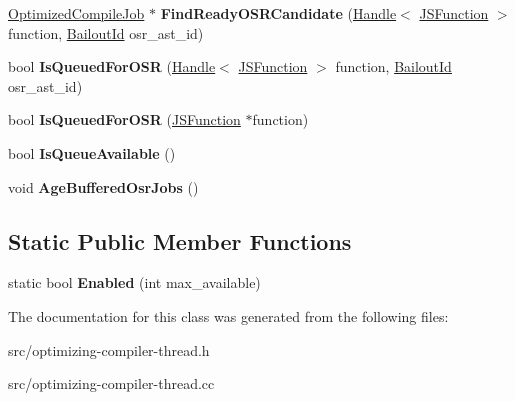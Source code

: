 \begin{DoxyCompactItemize}
\item 
\hypertarget{classv8_1_1internal_1_1_optimizing_compiler_thread_ac26451d45beab3fd272c0f62aea80f6e}{}\hyperlink{classv8_1_1internal_1_1_optimized_compile_job}{Optimized\+Compile\+Job} $\ast$ {\bfseries Find\+Ready\+O\+S\+R\+Candidate} (\hyperlink{classv8_1_1internal_1_1_handle}{Handle}$<$ \hyperlink{classv8_1_1internal_1_1_j_s_function}{J\+S\+Function} $>$ function, \hyperlink{classv8_1_1internal_1_1_bailout_id}{Bailout\+Id} osr\+\_\+ast\+\_\+id)\label{classv8_1_1internal_1_1_optimizing_compiler_thread_ac26451d45beab3fd272c0f62aea80f6e}

\item 
\hypertarget{classv8_1_1internal_1_1_optimizing_compiler_thread_a8c6bd97e45ddcf86180a239a1a780b1c}{}bool {\bfseries Is\+Queued\+For\+O\+S\+R} (\hyperlink{classv8_1_1internal_1_1_handle}{Handle}$<$ \hyperlink{classv8_1_1internal_1_1_j_s_function}{J\+S\+Function} $>$ function, \hyperlink{classv8_1_1internal_1_1_bailout_id}{Bailout\+Id} osr\+\_\+ast\+\_\+id)\label{classv8_1_1internal_1_1_optimizing_compiler_thread_a8c6bd97e45ddcf86180a239a1a780b1c}

\item 
\hypertarget{classv8_1_1internal_1_1_optimizing_compiler_thread_a53f5fbf23fd22a240c35fd183f2da533}{}bool {\bfseries Is\+Queued\+For\+O\+S\+R} (\hyperlink{classv8_1_1internal_1_1_j_s_function}{J\+S\+Function} $\ast$function)\label{classv8_1_1internal_1_1_optimizing_compiler_thread_a53f5fbf23fd22a240c35fd183f2da533}

\item 
\hypertarget{classv8_1_1internal_1_1_optimizing_compiler_thread_a06535287e5fe9c3b64f91b1987bfbfda}{}bool {\bfseries Is\+Queue\+Available} ()\label{classv8_1_1internal_1_1_optimizing_compiler_thread_a06535287e5fe9c3b64f91b1987bfbfda}

\item 
\hypertarget{classv8_1_1internal_1_1_optimizing_compiler_thread_ac809de038e669f630f4d32864b167729}{}void {\bfseries Age\+Buffered\+Osr\+Jobs} ()\label{classv8_1_1internal_1_1_optimizing_compiler_thread_ac809de038e669f630f4d32864b167729}

\end{DoxyCompactItemize}
\subsection*{Static Public Member Functions}
\begin{DoxyCompactItemize}
\item 
\hypertarget{classv8_1_1internal_1_1_optimizing_compiler_thread_a14c20db9e9f3f7ef0964be2abbaaea04}{}static bool {\bfseries Enabled} (int max\+\_\+available)\label{classv8_1_1internal_1_1_optimizing_compiler_thread_a14c20db9e9f3f7ef0964be2abbaaea04}

\end{DoxyCompactItemize}


The documentation for this class was generated from the following files\+:\begin{DoxyCompactItemize}
\item 
src/optimizing-\/compiler-\/thread.\+h\item 
src/optimizing-\/compiler-\/thread.\+cc\end{DoxyCompactItemize}
